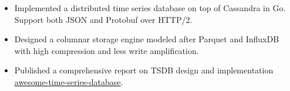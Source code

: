 \documentclass[11pt, letterpaper]{simple-cv}
\begin{document}

\begin{itemize}
	\item Implemented a distributed time series database on top of Cassandra in Go. Support both JSON and Protobuf over HTTP/2.
	\item Designed a columnar storage engine modeled after Parquet and InfluxDB with high compression and less write amplification.
	\item Published a comprehensive report on TSDB design and implementation \href{https://xephonhq.github.io/awesome-time-series-database}{awesome-time-series-database}.
\end{itemize}





\end{document}
